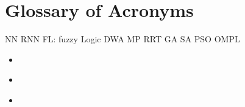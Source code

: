 \chapter*{Glossary of Acronyms}

NN
RNN
FL: fuzzy Logic
DWA
MP
RRT
GA
SA
PSO
OMPL
\begin{itemize}
    \item \textbf{} 
    \item \textbf{} 

    \newpage
    \thispagestyle{acronyms}
    \item \textbf{} 

\end{itemize}

\newpage







